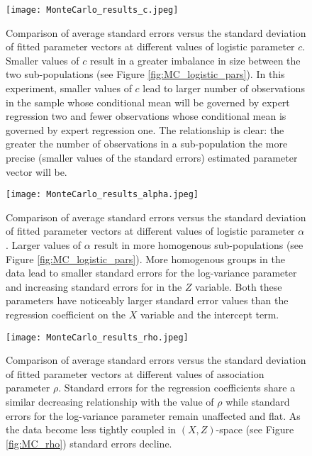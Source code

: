 \documentclass[12pt]{article}
\theoremstyle{definition}
\begin{document}
\begin{figure}[t!]
  \texttt{[image: MonteCarlo\_results\_c.jpeg]}
  \caption{Comparison of average standard errors versus the standard deviation of fitted parameter vectors at different values of logistic parameter $c$. Smaller values of $c$ result in a greater imbalance in size between the two sub-populations (see Figure \ref{fig:MC_logistic_pars}). In this experiment, smaller values of $c$ lead to larger number of observations in the sample whose conditional mean will be governed by expert regression two and fewer observations whose conditional mean is governed by expert regression one. The relationship is clear: the greater the number of observations in a sub-population the more precise (smaller values of the standard errors) estimated parameter vector will be.}
  \label{fig:MonteCarlo_results_c}
\end{figure}


\begin{figure}[t!]
  \texttt{[image: MonteCarlo\_results\_alpha.jpeg]}
  \caption{Comparison of average standard errors versus the standard deviation of fitted parameter vectors at different values of logistic parameter $\alpha$. Larger values of $\alpha$ result in more homogenous sub-populations (see Figure \ref{fig:MC_logistic_pars}). More homogenous groups in the data lead to smaller standard errors for the log-variance parameter and increasing standard errors for in the $Z$ variable. Both these parameters have noticeably larger standard error values than the regression coefficient on the $X$ variable and the intercept term.}
  \label{fig:MonteCarlo_results_alpha}
\end{figure}


\begin{figure}[t!]
  \texttt{[image: MonteCarlo\_results\_rho.jpeg]}
  \caption{Comparison of average standard errors versus the standard deviation of fitted parameter vectors at different values of association parameter $\rho$. Standard errors for the regression coefficients share a similar decreasing relationship with the value of $\rho$ while standard errors for the log-variance parameter remain unaffected and flat. As the data become less tightly coupled in $(X, Z)$-space (see Figure \ref{fig:MC_rho}) standard errors decline.}
  \label{fig:MonteCarlo_results_rho}
\end{figure}
\end{document}
